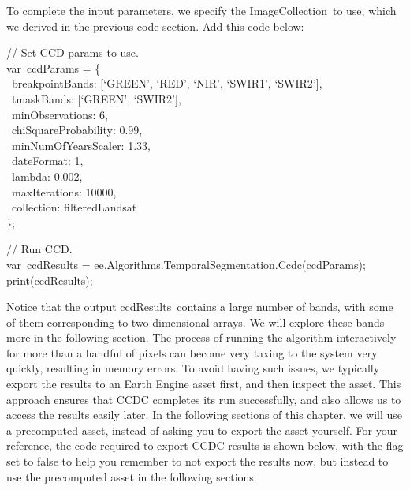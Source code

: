 \documentclass[
  letterpaper,
  DIV=11,
  numbers=noendperiod]{scrreprt}
\begin{document}
To complete the input parameters, we specify the ImageCollection~to use,
which we derived in the previous code section. Add this code below:

// Set CCD params to use.\\
var~ccdParams = \{\\
\hspace*{0.333em} ~breakpointBands: {[}`GREEN', `RED', `NIR', `SWIR1',
`SWIR2'{]},\\
\hspace*{0.333em} ~tmaskBands: {[}`GREEN', `SWIR2'{]},\\
\hspace*{0.333em} ~minObservations: 6,\\
\hspace*{0.333em} ~chiSquareProbability: 0.99,\\
\hspace*{0.333em} ~minNumOfYearsScaler: 1.33,\\
\hspace*{0.333em} ~dateFormat: 1,\\
\hspace*{0.333em} ~lambda: 0.002,\\
\hspace*{0.333em} ~maxIterations: 10000,\\
\hspace*{0.333em} ~collection: filteredLandsat\\
\};

// Run CCD.\\
var~ccdResults = ee.Algorithms.TemporalSegmentation.Ccdc(ccdParams);\\
print(ccdResults);

Notice that the output ccdResults~contains a large number of bands, with
some of them corresponding to two-dimensional arrays. We will explore
these bands more in the following section. The process of running the
algorithm interactively for more than a handful of pixels can become
very taxing to the system very quickly, resulting in memory errors. To
avoid having such issues, we typically export the results to an Earth
Engine asset first, and then inspect the asset. This approach ensures
that CCDC completes its run successfully, and also allows us to access
the results easily later. In the following sections of this chapter, we
will use a precomputed asset, instead of asking you to export the asset
yourself. For your reference, the code required to export CCDC results
is shown below, with the flag set to false to help you remember to not
export the results now, but instead to use the precomputed asset in the
following sections.
\end{document}
